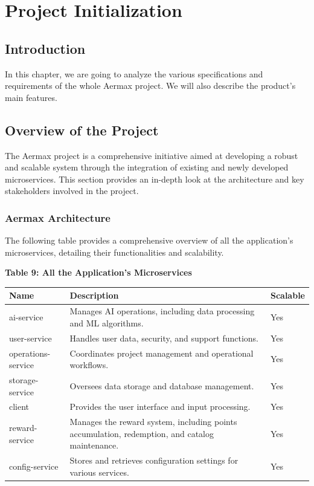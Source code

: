 \chapter{Project Initialization}


\setcounter{secnumdepth}{0} %


\section{Introduction}
In this chapter, we are going to analyze the various specifications and requirements of the whole Aermax project.
We will also describe the product's main features.
\setcounter{secnumdepth}{0}
\section{Overview of the Project}
The Aermax project is a comprehensive initiative aimed at developing a robust and scalable system through the integration of existing and newly developed microservices. This section provides an in-depth look at the architecture and key stakeholders involved in the project.

\subsection{Aermax Architecture}

The following table provides a comprehensive overview of all the application's microservices, detailing their functionalities and scalability.

\textbf{Table 9: All the Application’s Microservices}
\begin{longtable}{|p{3cm}|p{7cm}|p{2cm}|}
    \hline
    \textbf{Name} & \textbf{Description} & \textbf{Scalable} \\
    \hline
    \endhead
    ai-service & Manages AI operations, including data processing and ML algorithms. & Yes \\
    \hline
    user-service & Handles user data, security, and support functions. & Yes \\
    \hline
    operations-service & Coordinates project management and operational workflows. & Yes \\
    \hline
    storage-service & Oversees data storage and database management. & Yes \\
    \hline
    client & Provides the user interface and input processing. & Yes \\
    \hline
    reward-service & Manages the reward system, including points accumulation, redemption, and catalog maintenance. & Yes \\
    \hline
    config-service & Stores and retrieves configuration settings for various services. & Yes \\
    \hline
\end{longtable}

